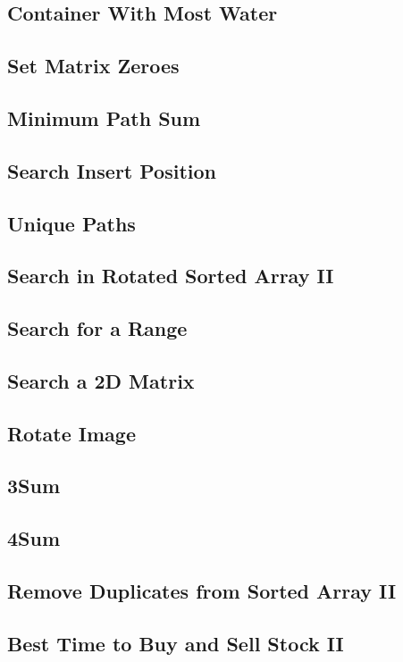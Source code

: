 \documentclass[11pt]{book}
\begin{document}
\subsection{Container With Most Water}
\label{sec-1-2-3}
\subsection{Set Matrix Zeroes}
\label{sec-1-2-4}
\subsection{Minimum Path Sum}
\label{sec-1-2-5}
\subsection{Search Insert Position}
\label{sec-1-2-6}
\subsection{Unique Paths}
\label{sec-1-2-7}
\subsection{Search in Rotated Sorted Array II}
\label{sec-1-2-8}
\subsection{Search for a Range}
\label{sec-1-2-9}
\subsection{Search a 2D Matrix}
\label{sec-1-2-10}
\subsection{Rotate Image}
\label{sec-1-2-11}
\subsection{3Sum}
\label{sec-1-2-12}
\subsection{4Sum}
\label{sec-1-2-13}
\subsection{Remove Duplicates from Sorted Array II}
\label{sec-1-2-14}
\subsection{Best Time to Buy and Sell Stock II}
\label{sec-1-2-15}
\end{document}
